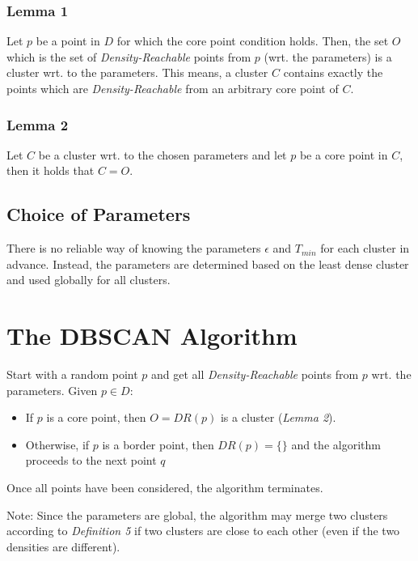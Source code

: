 \subsubsection*{Lemma 1}
Let $p$ be a point in $D$ for which the core point condition holds. Then, the set $O$ which is the set of \textit{Density-Reachable} points from $p$ (wrt. the parameters) is a cluster wrt. to the parameters. This means, a cluster $C$ contains exactly the points which are \textit{Density-Reachable} from an arbitrary core point of $C$.

\subsubsection*{Lemma 2}
Let $C$ be a cluster wrt. to the chosen parameters and let $p$ be a core point in $C$, then it holds that $C = O$.

\subsection{Choice of Parameters}
There is no reliable way of knowing the parameters $\epsilon$ and $T_{min}$ for each cluster in advance. Instead, the parameters are determined based on the least dense cluster and used globally for all clusters.

\section{The DBSCAN Algorithm}
Start with a random point $p$ and get all \textit{Density-Reachable} points from $p$ wrt. the parameters.
Given $p \in D$: 
\begin{itemize}
\item If $p$ is a core point, then $O = DR(p)$ is a cluster (\textit{Lemma 2}).
\item Otherwise, if $p$ is a border point, then $DR(p) = \{\}$ and the algorithm proceeds to the next point $q$
\end{itemize}
Once all points have been considered, the algorithm terminates. 

Note: Since the parameters are global, the algorithm may merge two clusters according to \textit{Definition 5} if two clusters are close to each other (even if the two densities are different).
